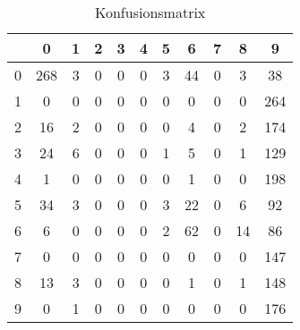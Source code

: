 \begin{table}[hp]
    \centering
    \begin{tabular}{|c|c|c|c|c|c|c|c|c|c|c|}
        \hline
        \cellcolor{th} & \cellcolor{th} 0 & \cellcolor{th} 1 & \cellcolor{th} 2 & \cellcolor{th} 3 & \cellcolor{th} 4 & \cellcolor{th} 5 & \cellcolor{th} 6 & \cellcolor{th} 7 & \cellcolor{th} 8 & \cellcolor{th} 9\\ \hline
        \cellcolor{th} 0 & 268 &   3 &   0 &   0 &   0 &   3 &  44 &   0 &   3 &  38 \\ \hline
        \cellcolor{th} 1 &   0 &   0 &   0 &   0 &   0 &   0 &   0 &   0 &   0 & 264 \\ \hline
        \cellcolor{th} 2 &  16 &   2 &   0 &   0 &   0 &   0 &   4 &   0 &   2 & 174 \\ \hline
        \cellcolor{th} 3 &  24 &   6 &   0 &   0 &   0 &   1 &   5 &   0 &   1 & 129 \\ \hline
        \cellcolor{th} 4 &   1 &   0 &   0 &   0 &   0 &   0 &   1 &   0 &   0 & 198 \\ \hline
        \cellcolor{th} 5 &  34 &   3 &   0 &   0 &   0 &   3 &  22 &   0 &   6 &  92 \\ \hline
        \cellcolor{th} 6 &   6 &   0 &   0 &   0 &   0 &   2 &  62 &   0 &  14 &  86 \\ \hline
        \cellcolor{th} 7 &   0 &   0 &   0 &   0 &   0 &   0 &   0 &   0 &   0 & 147 \\ \hline
        \cellcolor{th} 8 &  13 &   3 &   0 &   0 &   0 &   0 &   1 &   0 &   1 & 148 \\ \hline
        \cellcolor{th} 9 &   0 &   1 &   0 &   0 &   0 &   0 &   0 &   0 &   0 & 176 \\ \hline
    \end{tabular}
    \caption{Konfusionsmatrix}
\end{table}
\\
